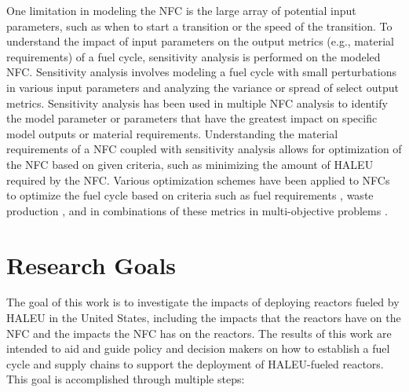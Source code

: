 One limitation in modeling the \gls{NFC} is the large array of potential 
input parameters, such as when to start a transition or the speed of the 
transition. To understand 
the impact of input parameters on the output metrics (e.g., material 
requirements) of a fuel cycle, sensitivity analysis is
performed on the modeled \gls{NFC}. Sensitivity analysis involves 
modeling a fuel cycle with small perturbations in various input 
parameters and analyzing the variance or spread of select output metrics. 
Sensitivity analysis has been used in multiple \gls{NFC} analysis 
\cite{chee_sensitivity_2019,feng_sensitivity_2020,thiolliere_methodology_2018}
to identify the model parameter or parameters that have the greatest 
impact on specific model outputs or material requirements. Understanding the 
material requirements of a \gls{NFC} coupled with sensitivity analysis 
allows for optimization of the \gls{NFC} based on given criteria, such as 
minimizing the amount of \gls{HALEU} required by the \gls{NFC}. Various 
optimization schemes have been applied to \glspl{NFC} to optimize the fuel 
cycle based on criteria such as fuel requirements \cite{kim_selection_1999},
waste production \cite{shwageraus_optimization_2003}, and in combinations 
of these metrics in multi-objective 
problems \cite{passerini_systematic_2014}.

\section{Research Goals}
The goal of this work is to investigate the impacts of deploying reactors 
fueled 
by \gls{HALEU} in the United States, including the impacts that the reactors 
have on the \gls{NFC} and the impacts the \gls{NFC} has on the reactors. 
The results of this work are intended to
aid and guide policy and decision makers on how to establish a fuel cycle and 
supply chains to support the deployment of \gls{HALEU}-fueled reactors. 
This goal is accomplished 
through multiple steps: 

